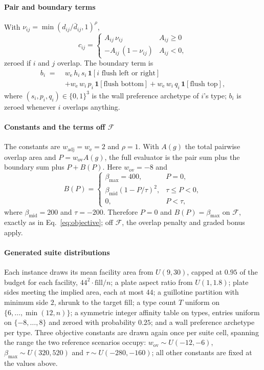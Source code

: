 \documentclass[preprint,12pt,authoryear]{elsarticle}
\newcommand{\cF}{\mathcal{F}}
\begin{document}
\paragraph{Pair and boundary terms}
With $\nu_{ij}=\min(d_{ij}/\bar d_{ij},1)^{\rho}$,
\[
c_{ij}=\begin{cases}A_{ij}\,\nu_{ij} & A_{ij}\ge 0\\ -A_{ij}\,(1-\nu_{ij}) & A_{ij}<0,\end{cases}
\]
zeroed if $i$ and $j$ overlap. The boundary term is
\begin{align*}
b_i \;=\;& w_{\mathrm e}\,h_i\,s_i\,\mathbf 1[\text{$i$ flush left or right}]\\
 &+ w_{\mathrm e}\,w_i\,p_i\,\mathbf 1[\text{flush bottom}]
  + w_{\mathrm e}\,w_i\,q_i\,\mathbf 1[\text{flush top}],
\end{align*}
where $(s_i,p_i,q_i)\in\{0,1\}^3$ is the wall preference archetype of $i$'s
type; $b_i$ is zeroed whenever $i$ overlaps anything.

\paragraph{Constants and the terms off $\cF$}
The constants are $w_{\mathrm{adj}}=w_{\mathrm e}=2$ and $\rho=1$. With
$A(g)$ the total pairwise overlap area and $P=w_{\mathrm{ov}}A(g)$, the full
evaluator is the pair sum plus the boundary sum plus $P+B(P)$. Here
$w_{\mathrm{ov}}=-8$ and
\[
B(P)=\begin{cases}
\beta_{\max}=400, & P=0,\\
\beta_{\mathrm{mid}}(1-P/\tau)^2, & \tau\le P<0,\\
0, & P<\tau,
\end{cases}
\]
where $\beta_{\mathrm{mid}}=200$ and $\tau=-200$. Therefore $P=0$ and
$B(P)=\beta_{\max}$ on $\cF$, exactly as in Eq.~\eqref{eq:objective}; off
$\cF$, the overlap penalty and graded bonus apply.

\paragraph{Generated suite distributions}
Each instance draws its mean facility area from $U(9,30)$, capped at $0.95$ of
the budget for each facility, $44^2\cdot\mathrm{fill}/n$; a plate aspect ratio from
$U(1,1.8)$; plate sides meeting the implied area, each at most $44$; a
guillotine partition with minimum side $2$, shrunk to the target fill; a type
count $T$ uniform on $\{6,\dots,\min(12,n)\}$; a symmetric integer affinity
table on types, entries uniform on $\{-8,\dots,8\}$ and zeroed with
probability $0.25$; and a wall preference archetype per type. Three objective
constants are drawn again once per suite cell, spanning the range the two
reference scenarios occupy: $w_{\mathrm{ov}}\sim U(-12,-6)$,
$\beta_{\max}\sim U(320,520)$ and $\tau\sim U(-280,-160)$; all other constants
are fixed at the values above.
\end{document}

